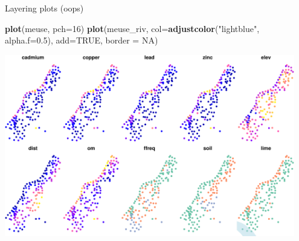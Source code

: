\documentclass[11pt,ignorenonframetext,]{beamer}
\newenvironment{Shaded}{}{}
\newcommand{\KeywordTok}[1]{\textcolor[rgb]{0.00,0.44,0.13}{\textbf{#1}}}
\newcommand{\DataTypeTok}[1]{\textcolor[rgb]{0.56,0.13,0.00}{#1}}
\newcommand{\DecValTok}[1]{\textcolor[rgb]{0.25,0.63,0.44}{#1}}
\newcommand{\FloatTok}[1]{\textcolor[rgb]{0.25,0.63,0.44}{#1}}
\newcommand{\StringTok}[1]{\textcolor[rgb]{0.25,0.44,0.63}{#1}}
\newcommand{\OtherTok}[1]{\textcolor[rgb]{0.00,0.44,0.13}{#1}}
\newcommand{\NormalTok}[1]{#1}
\let\oldShaded\Shaded
\let\endoldShaded\endShaded
\renewenvironment{Shaded}{\footnotesize\begin{spacing}{0.9}\oldShaded}{\endoldShaded\end{spacing}}
\let\oldverbatim\verbatim
\let\endoldverbatim\endverbatim
\newcommand{\scriptoutput}{
  \renewenvironment{Shaded}{\scriptsize\begin{spacing}{0.9}\oldShaded}{\endoldShaded\end{spacing}}
  \renewenvironment{verbatim}{\scriptsize\begin{spacing}{0.9}\oldverbatim}{\endoldverbatim\end{spacing}}
}
\begin{document}
\begin{frame}[fragile,t]{Layering plots (oops)}

\scriptoutput

\begin{Shaded}
\begin{Highlighting}[]
\KeywordTok{plot}\NormalTok{(meuse, }\DataTypeTok{pch=}\DecValTok{16}\NormalTok{)}
\KeywordTok{plot}\NormalTok{(meuse_riv, }\DataTypeTok{col=}\KeywordTok{adjustcolor}\NormalTok{(}\StringTok{"lightblue"}\NormalTok{, }\DataTypeTok{alpha.f=}\FloatTok{0.5}\NormalTok{), }\DataTypeTok{add=}\OtherTok{TRUE}\NormalTok{, }\DataTypeTok{border =} \OtherTok{NA}\NormalTok{)}
\end{Highlighting}
\end{Shaded}

\begin{center}\includegraphics[width=0.95\textwidth]{Lec17_files/figure-beamer/unnamed-chunk-11-1} \end{center}

\end{frame}
\end{document}

